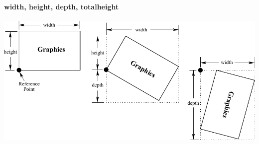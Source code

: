 \documentclass[article]{beamer}
\begin{document}
\begin{frame}
  \frametitle{\thesubsection}
  \framesubtitle{width, height, depth, totalheight}
  \vspace{32pt}
  \centering
  \includegraphics[width=\textwidth]{Rotation}
\end{frame}
\end{document}
